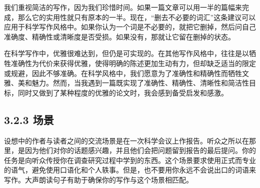 我们重视简洁的写作，因为我们珍惜时间。如果一篇文章可以用一半的篇幅来完成，那么它的实用性就只有原本的一半。现在，“删去不必要的词汇”这条建议可以应用于科学写作风格中。如果你认为一个词是不必要的，就把它删掉，然后问自己准确度、精确性或清晰度是否受损。如果没有，那就让它留在删掉的状态。

在科学写作中，优雅很难达到，但仍是可实现的。在其他写作风格中，往往是以牺牲准确性为代价来获得优雅，使得明确的陈述更加生动有力，但却缺乏适当的限定或规避，因此不够准确。在科学风格中，我们愿意为了准确性和精确性而牺牲文雅、美和魅力。然而，当我遇到一篇既实现了准确性、精确性、清晰性和简洁性目标，同时又做到了某种程度的优雅的论文时，我会感到备受启发和感激。

\subsection*{3.2.3 场景}
设想中的作者与读者之间的交流场景是在一次科学会议上作报告。听众之所以在那里，是因为他们对你的话题感兴趣，并且他们会把问题留到报告的最后提问。你的任务是向听众传授你在调查研究过程中学到的东西。这个场景要求使用正式而专业的语气，避免使用口语化和个人轶事。但是，也不要用你永远不会说出口的词语来写作。大声朗读句子有助于确保你的写作与这个场景相匹配。

